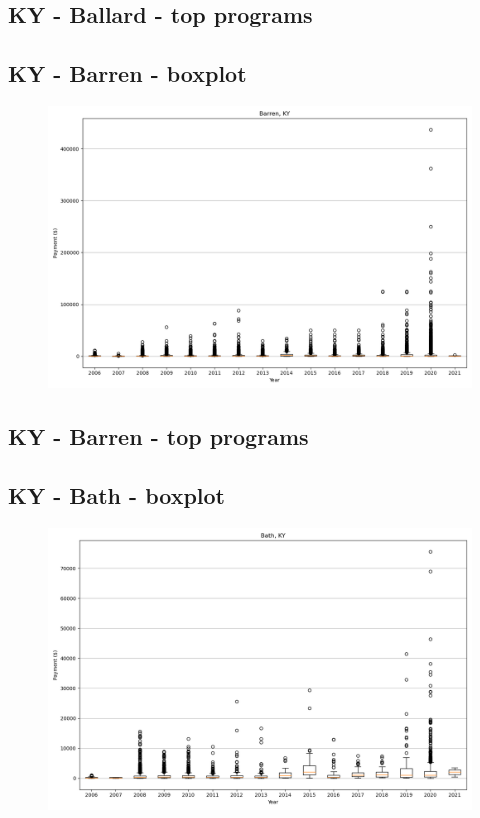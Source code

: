 \subsection*{KY - Ballard - top programs}

\newpage
\subsection*{KY - Barren - boxplot}
\begin{figure}[h]
\centering
\includegraphics[width=7in]{../output/boxplots/counties/Barren-KY_boxplot.png}
\end{figure}


\subsection*{KY - Barren - top programs}

\newpage
\subsection*{KY - Bath - boxplot}
\begin{figure}[h]
\centering
\includegraphics[width=7in]{../output/boxplots/counties/Bath-KY_boxplot.png}
\end{figure}


